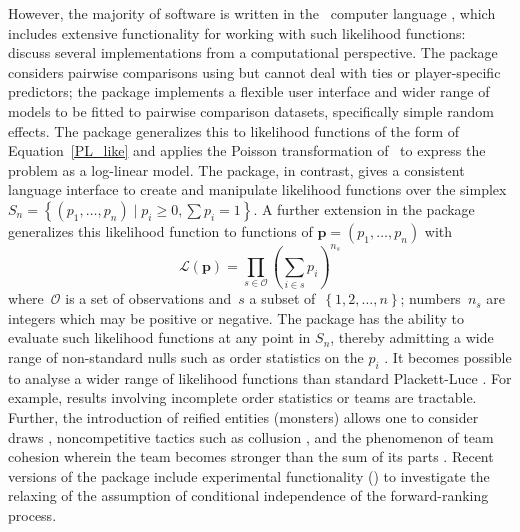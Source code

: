 \documentclass[article]{jss}
\begin{document}
However, the majority of software is written in the ~computer language \citep{rcore2023}, which includes extensive
functionality for working with such likelihood functions:
\cite{turner2020} discuss several implementations from a computational
perspective.  The  package \citep{firth2005}
considers pairwise comparisons using  but cannot deal
with ties or player-specific predictors; the 
package \citep{turner2012} implements a flexible user interface and
wider range of models to be fitted to pairwise comparison datasets,
specifically simple random effects.  The  package
\citep{turner2020} generalizes this to likelihood functions of the
form of Equation~\ref{PL_like} and applies the Poisson transformation
of~\cite{baker1994} to express the problem as a log-linear model.  The
 package, in contrast, gives a consistent language
interface to create and manipulate likelihood functions over the
simplex ${S}_n=\left\lbrace\left(p_1,\ldots,p_n\right)\mid p_i\geq
0,\sum p_i=1\right\rbrace$.  A further extension in the package
generalizes this likelihood function to functions of ${\mathbf
p}=(p_1,\ldots,p_n)$ with
%
\begin{equation}\label{hyper2likelihood}
\mathcal{L}\left(\mathbf{p}\right)=
\prod_{s\in \mathcal{O}}\left({\sum_{i\in s}}p_i\right)^{n_s}
\end{equation}
%
where~$\mathcal{O}$ is a set of observations and~$s$ a
subset of~$\left\{1,2,\ldots,n\right\}$; numbers~$n_s$ are integers
which may be positive or negative.  The  package has the
ability to evaluate such likelihood functions at any point in $S_n$,
thereby admitting a wide range of non-standard nulls such as order
statistics on the $p_i$ \citep{hankin2017}.  It becomes possible to
analyse a wider range of likelihood functions than standard
Plackett-Luce \citep{turner2020}.  For example, results involving
incomplete order statistics or teams are tractable.  Further, the
introduction of reified entities (monsters) allows one to consider
draws \citep{hankin2009}, noncompetitive tactics such as
collusion \citep{hankin2020}, and the phenomenon of team cohesion
wherein the team becomes stronger than the sum of its
parts \citep{hankin2010}.  Recent versions of the package include
experimental functionality () to investigate the
relaxing of the assumption of conditional independence of the
forward-ranking process.
\end{document}
